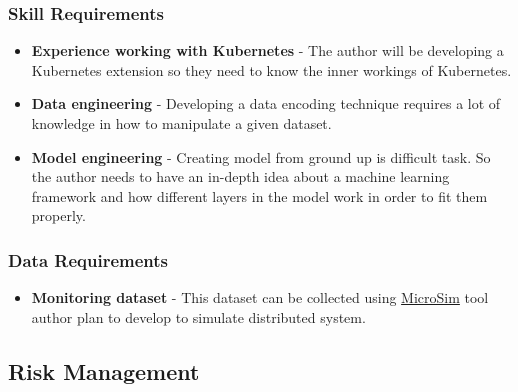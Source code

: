 \subsubsection{Skill Requirements}
\begin{itemize}[noitemsep,nolistsep] 
    \item \textbf{Experience working with Kubernetes} - The author will be developing a Kubernetes extension so they need to know the inner workings of Kubernetes.
    \item \textbf{Data engineering} -  Developing a data encoding technique requires a lot of knowledge in how to manipulate a given dataset.
    \item \textbf{Model engineering} - Creating model from ground up is difficult task. So the author needs to have an in-depth idea about a machine learning framework and how different layers in the model work in order to fit them properly. 
\end{itemize}

\subsubsection{Data Requirements}
\begin{itemize}[noitemsep,nolistsep] 
\item \textbf{Monitoring dataset} -  This dataset can be collected using \hyperref[microsim]{MicroSim} tool author plan to develop to simulate distributed system.
\end{itemize}

\subsection{Risk Management}


